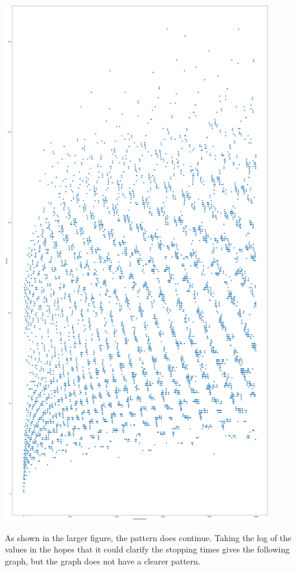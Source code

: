 \documentclass{article}
\theoremstyle{remark}
\theoremstyle{problem}
\numberwithin{problem}{subsection}
\numberwithin{Problem}{section}
\theoremstyle{definition}
\theoremstyle{definition}
\theoremstyle{definition}
\begin{document}
\begin{centering}
\includegraphics[height=9in]{images/10000 Collatz Stopping Times.png}
\end{centering}

As shown in the larger figure, the pattern does continue. Taking the log of the values in the hopes that it could clarify the stopping times gives the following graph, but the graph does not have a clearer pattern. 
\end{document}
